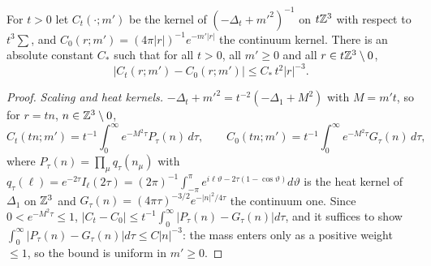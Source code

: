 \begin{lemma}\label{app:a04:lem:LP}
For $t>0$ let $C_t(\cdot;m')$ be the kernel of $(-\Delta_t+m'^2)^{-1}$ on $t\mathbb Z^3$ with respect to $t^3\sum$, and $C_0(r;m')=(4\pi|r|)^{-1}e^{-m'|r|}$ the continuum kernel. There is an absolute constant $C_*$ such that for all $t>0$, all $m'\ge0$ and all $r\in t\mathbb Z^3\setminus0$,
\[
|C_t(r;m')-C_0(r;m')|\le C_*\,t^2|r|^{-3}.
\]
\end{lemma}
\begin{proof}
\emph{Scaling and heat kernels.} $-\Delta_t+m'^2=t^{-2}(-\Delta_1+M^2)$ with $M=m't$, so for $r=tn$, $n\in\mathbb Z^3\setminus0$,
\[
C_t(tn;m')=t^{-1}\int_0^\infty e^{-M^2\tau}P_\tau(n)\,d\tau,\qquad C_0(tn;m')=t^{-1}\int_0^\infty e^{-M^2\tau}G_\tau(n)\,d\tau,
\]
where $P_\tau(n)=\prod_\mu q_\tau(n_\mu)$ with $q_\tau(\ell)=e^{-2\tau}I_\ell(2\tau)=(2\pi)^{-1}\int_{-\pi}^{\pi}e^{i\ell\vartheta-2\tau(1-\cos\vartheta)}d\vartheta$ is the heat kernel of $\Delta_1$ on $\mathbb Z^3$ and $G_\tau(n)=(4\pi\tau)^{-3/2}e^{-|n|^2/4\tau}$ the continuum one. Since $0<e^{-M^2\tau}\le1$, $|C_t-C_0|\le t^{-1}\int_0^\infty|P_\tau(n)-G_\tau(n)|d\tau$, and it suffices to show $\int_0^\infty|P_\tau(n)-G_\tau(n)|d\tau\le C|n|^{-3}$: the mass enters only as a positive weight $\le1$, so the bound is uniform in $m'\ge0$.


\end{proof}
